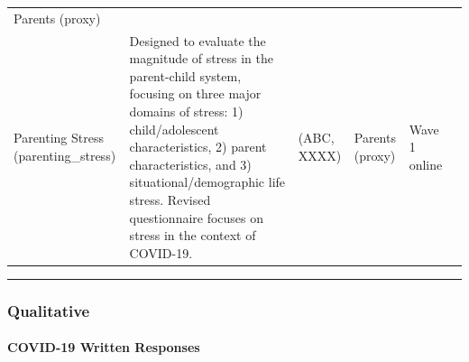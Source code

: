 \documentclass[]{book}
\let\oldparagraph\paragraph
\renewcommand{\paragraph}[1]{\oldparagraph{#1}\mbox{}}
\begin{document}
\begin{longtable}[]{@{}llllll@{}}
\begin{minipage}[t]{0.16\columnwidth}
Parents (proxy)\strut
\end{minipage} & \begin{minipage}[t]{0.06\columnwidth}\raggedright
\strut
\end{minipage} & \begin{minipage}[t]{0.10\columnwidth}\raggedright
\strut
\end{minipage}\tabularnewline
\begin{minipage}[t]{0.18\columnwidth}\raggedright
Parenting Stress (parenting\_stress)\strut
\end{minipage} & \begin{minipage}[t]{0.18\columnwidth}\raggedright
Designed to evaluate the magnitude of stress in the parent-child system, focusing on three major domains of stress: 1) child/adolescent characteristics, 2) parent characteristics, and 3) situational/demographic life stress. Revised questionnaire focuses on stress in the context of COVID-19.\strut
\end{minipage} & \begin{minipage}[t]{0.15\columnwidth}\raggedright
(ABC, XXXX)\strut
\end{minipage} & \begin{minipage}[t]{0.16\columnwidth}\raggedright
Parents (proxy)\strut
\end{minipage} & \begin{minipage}[t]{0.06\columnwidth}\raggedright
Wave 1 online\strut
\end{minipage} & \begin{minipage}[t]{0.10\columnwidth}\raggedright
\strut
\end{minipage}\tabularnewline
\bottomrule
\end{longtable}

\begin{center}\rule{0.5\linewidth}{0.5pt}\end{center}

\hypertarget{qualitative}{%
\subsubsection{Qualitative}\label{qualitative}}

\hypertarget{covid-19-written-responses}{%
\paragraph{COVID-19 Written Responses}\label{covid-19-written-responses}}
\end{document}
